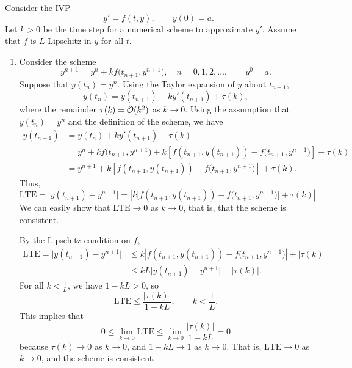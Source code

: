 \documentclass{homework}
\begin{document}
	\maketitle
	
	\question 
	
	Consider the IVP
	\begin{equation}
		\label{eq:ivp}
		y' = f(t,y), \qquad y(0) = a.
	\end{equation}
	Let $k > 0$ be the time step for a numerical scheme to approximate $y'$. Assume that $f$ is $L$-Lipschitz in $y$ for all $t$.
	
	\begin{enumerate}
		\item Consider the scheme
		\begin{equation}
			y^{n+1} = y^n + k f\big(t_{n+1}, y^{n+1}\big), \quad n = 0, 1, 2, \dots, \qquad y^0 = a.
		\end{equation}
		Suppose that $y(t_n) = y^n$. Using the Taylor expansion of $y$ about $t_{n+1}$,
		\begin{equation*}
			y(t_n) = y(t_{n+1}) - ky'(t_{n+1}) + \tau(k),
		\end{equation*}
		where the remainder $\tau(k) = \mathcal{O}(k^2)$ as $k\to 0$.
		Using the assumption that $y(t_n) = y^n$ and the definition of the scheme, we have
		\begin{align*}
			y(t_{n+1}) &= y(t_n) + ky'(t_{n+1}) + \tau(k) \\
			&= y^n + kf\big(t_{n+1}, y^{n+1}\big) + k\left[f(t_{n+1},y(t_{n+1})) - f\big(t_{n+1},y^{n+1}\big)\right] + \tau(k) \\
			&= y^{n+1} + k\left[f(t_{n+1},y(t_{n+1})) - f\big(t_{n+1},y^{n+1}\big)\right] + \tau(k).
		\end{align*}
		Thus,
		\begin{equation*}
			\text{LTE} = \big|y(t_{n+1}) - y^{n+1}\big| = \left|k\big[f(t_{n+1},y(t_{n+1})) - f\big(t_{n+1},y^{n+1}\big)\big] + \tau(k)\right|.
		\end{equation*}
		We can easily show that $\text{LTE} \to 0$ as $k\to 0$, that is, that the scheme is consistent.
		
		By the Lipschitz condition on $f$,
		\begin{align*}
			\text{LTE} = \big|y(t_{n+1})-y^{n+1}\big| &\le k\left|f(t_{n+1},y(t_{n+1})) - f\big(t_{n+1},y^{n+1}\big)\right| + |\tau(k)|\\
			&\le kL\big|y(t_{n+1})-y^{n+1}\big| + |\tau(k)|.
		\end{align*}
		For all $k < \frac{1}{L}$, we have $1-kL > 0$, so
		\begin{equation*}
			\text{LTE} \le \frac{|\tau(k)|}{1-kL}, \qquad k < \frac{1}{L}.
		\end{equation*}
		This implies that
		\begin{equation*}
			0 \le \lim_{k\to 0}\text{LTE} \le \lim_{k\to0}\frac{|\tau(k)|}{1-kL} = 0
		\end{equation*}
		because $\tau(k) \to 0$ as $k \to 0$, and $1-kL \to 1$ as $k\to 0$. That is, $\text{LTE} \to 0$ as $k\to0$, and the scheme is consistent.
		

\end{enumerate}
\end{document}
